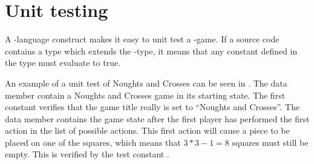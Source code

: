 

\section{Unit testing}
A \productname{}-language construct makes it easy to unit test a \productname{}-game.
If a source code contains a type which extends the -type, it means that any constant defined in the type must evaluate to true.

An example of a unit test of Noughts and Crosses can be seen in .
The data member  contain a Noughts and Crosses game in its starting state.
The first constant  verifies that the game title really is set to ``Noughts and Crosses''.
The data member  contains the game state after the first player has 
performed the first action in the list of possible actions. This first action will cause a piece to be placed on one of the squares, which means 
that $3*3 - 1 = 8$ squares must still be empty. This is verified by the test constant .

